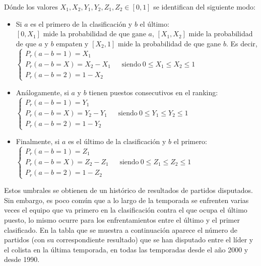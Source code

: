 Dónde los valores $X_{1},X_{2},Y_{1},Y_{2},Z_{1},Z_{2} \in [0,1]$ se identifican del siguiente modo:
\begin{itemize}
	\item Si $a$ es el primero de la clasificación y $b$ el último:\\
	 $[0,X_{1}]$ mide la probabilidad de que gane $a$, $[X_{1},X_{2}]$ mide la probabilidad de que $a$ y $b$ empaten y $[X_{2},1]$ mide la probabilidad de que gane $b$.
	 Es decir,\\
	 
	 $\begin{cases}
	 	P_{r}(a-b=1)=X_{1}\\
	 	P_{r}(a-b=X)=X_{2}-X_{1} \ \ \ \ \ \ \ \text{siendo} \ 0 \leq X_{1} \leq X_{2} \leq 1\\
	 	P_{r}(a-b=2)=1-X_{2} 
	 \end{cases}$\\
	 
	\item Análogamente, si $a$ y $b$ tienen puestos consecutivos en el ranking:\\
	
	$\begin{cases}
	P_{r}(a-b=1)=Y_{1}\\
	P_{r}(a-b=X)=Y_{2}-Y_{1} \ \ \ \ \ \ \ \text{siendo} \ 0 \leq Y_{1} \leq Y_{2} \leq 1\\
	P_{r}(a-b=2)=1-Y_{2} 
	\end{cases}$\\
	
	\item Finalmente, si $a$ es el último de la clasificación y $b$ el primero:\\
	
	$\begin{cases}
	P_{r}(a-b=1)=Z_{1}\\
	P_{r}(a-b=X)=Z_{2}-Z_{1} \ \ \ \ \ \ \ \text{siendo} \ 0 \leq Z_{1} \leq Z_{2} \leq 1\\
	P_{r}(a-b=2)=1-Z_{2} 
	\end{cases}$
\end{itemize}

Estos umbrales se obtienen de un histórico de resultados de partidos disputados. Sin embargo, es poco común que a lo largo de la temporada se enfrenten varias veces el equipo que va primero en la clasificación contra el que ocupa el último puesto, lo mismo ocurre para los enfrentamientos entre el último y el primer clasificado. En la tabla que se muestra a continuación aparece el número de partidos (con su correspondiente resultado) que se han disputado entre el líder y el colista en la última temporada, en todas las temporadas desde el año 2000 y desde 1990.

